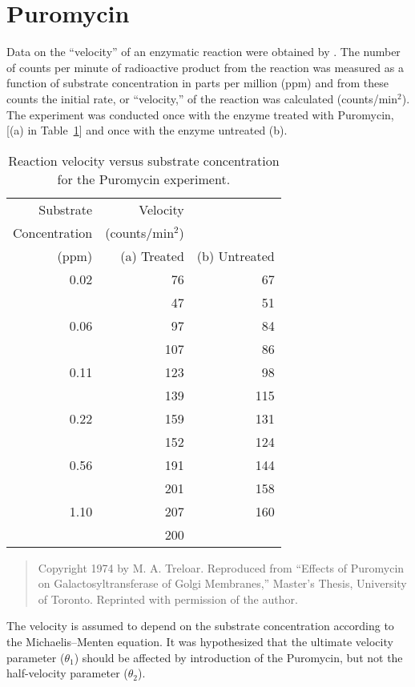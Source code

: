 \section{Puromycin}

Data on the ``velocity''
of an enzymatic reaction were obtained by .
The number of counts per minute of radioactive product from the reaction
was measured
as a function of substrate concentration in parts per million (ppm) and
from these counts the initial rate, or ``velocity,''
of the reaction was
calculated (counts/min$^{2}$).
The experiment was conducted once with the enzyme treated with
Puromycin, [(a) in Table~\ref{atbl:mic}] and once with the enzyme
untreated (b).
\begin{table}
  \caption{\label{atbl:mic}
  Reaction velocity versus substrate concentration for the Puromycin
  experiment.}
  \begin{center}
    \begin{tabular}{r r r}\hline
      Substrate&Velocity\\
      Concentration&(counts/min$^{2}$)\\
      (ppm)&(a) Treated&(b) Untreated\\ \hline
      0.02&76&67\\
      &47&51\\
      0.06&97&84\\
      &107&86\\
      0.11&123&98\\
      &139&115\\
      0.22&159&131\\
      &152&124\\
      0.56&191&144\\
      &201&158\\
      1.10&207&160\\
      &200\\ \hline
    \end{tabular}
    \begin{quote}\small
      Copyright 1974 by M. A. Treloar.  Reproduced from ``Effects
      of Puromycin on Galactosyltransferase of Golgi Membranes,''
      Master's Thesis, University of Toronto.  Reprinted with permission
      of the author.
    \end{quote}
  \end{center}
\end{table}
The velocity is assumed to depend on the substrate concentration
according to the Michaelis--Menten equation.
It was hypothesized that the ultimate velocity parameter
($\theta_1$) should be affected by introduction of the Puromycin,
but not the half-velocity parameter ($\theta_2$).

